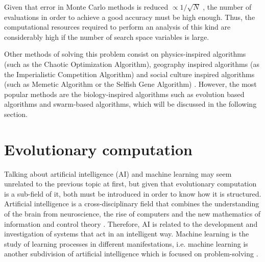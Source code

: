     Given that error in Monte Carlo methods is reduced $\propto 1/\sqrt{N}$ \cite{caflisch1998monte}, the number of evaluations in order to achieve a good accuracy must be high enough. Thus, the computational resources required to perform an analysis of this kind are considerably high if the number of search space variables is large.
    
    Other methods of solving this problem consist on physics-inspired algorithms (such as the Chaotic Optimization Algorithm), geography inspired algorithms (as the Imperialistic Competition Algorithm) and social culture inspired algorithms (such as  Memetic Algorithm or the Selfish Gene Algorithm) \cite{cui2017multi}. However, the most popular methods are the biology-inspired algorithms such as evolution based algorithms and swarm-based algorithms, which will be discussed in the following section.

\newpage

\section{Evolutionary computation}

    Talking about artificial intelligence (AI) and machine learning may seem unrelated to the previous topic at first, but given that evolutionary computation is a sub-field of it, both must be introduced in order to know how it is structured. Artificial intelligence is a cross-disciplinary field that combines the understanding of the brain from neuroscience, the rise of computers and the new mathematics of information and control theory \cite{cleverAlgorithms}. Therefore, AI is related to the development and investigation of systems that act in an intelligent way. Machine learning is the study of learning processes in different manifestations, i.e. machine learning is another subdivision of artificial intelligence which is focused on problem-solving \cite{michalski2013machine}.
    
